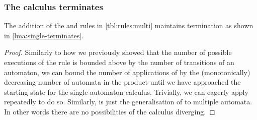 \documentclass[acmsmall,review,anonymous,screen]{acmart}\settopmatter{printfolios=true,printccs=false,printacmref=true}
\theoremstyle{definition}
\begin{document}
\subsubsection{The calculus terminates}
\begin{lemma}
  The addition of the \ExpandM{} and \Materialise{} rules in \cref{tbl:rules:multi}
  maintains termination as shown in \cref{lma:single-terminates}.
\end{lemma}
\begin{proof}
  Similarly to how we previously showed that the number of possible executions
  of the \Split{} rule is bounded above by the number of transitions of an
  automaton, we can bound the number of applications of \Materialise{} by the
  (monotonically) decreasing number of automata in the product until we have
  approached the starting state for the single-automaton calculus. Trivially, we
  can eagerly apply \Materialise{} repeatedly to do so. Similarly, \ExpandM{} is
  just the generalisation of \Expand{} to multiple automata. In other words there are no possibilities of the calculus diverging.
\end{proof}
\end{document}

